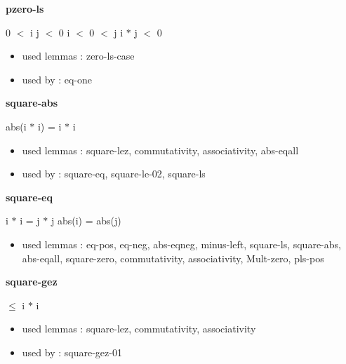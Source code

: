 \documentclass[a4paper]{article}
\begin{document}
\medskip

\bigskip

{\large\bf pzero-ls}

\medskip

0 $<$ i \And j $<$ 0 \Or i $<$ 0  $<$ j \Fol i $*$ j $<$ 0

\begin{itemize}


\item       used lemmas  : zero-ls-case
\item       used by      : eq-one

\end{itemize}

\medskip

\bigskip

{\large\bf square-abs}

\medskip

 \Fol abs(i $*$ i) = i $*$ i

\begin{itemize}


\item       used lemmas  : square-lez, commutativity, associativity, abs-eqall
\item       used by      : square-eq, square-le-02, square-ls

\end{itemize}

\medskip

\bigskip

{\large\bf square-eq}

\medskip

 \Fol i $*$ i = j $*$ j \Equiv abs(i) = abs(j)

\begin{itemize}


\item       used lemmas  : eq-pos, eq-neg, abs-eqneg, minus-left, square-ls, square-abs, abs-eqall, square-zero, commutativity, associativity, Mult-zero, pls-pos

\end{itemize}

\medskip

\bigskip

{\large\bf square-gez}

\medskip

  $\le$ i $*$ i

\begin{itemize}


\item       used lemmas  : square-lez, commutativity, associativity
\item       used by      : square-gez-01

\end{itemize}
\end{document}
